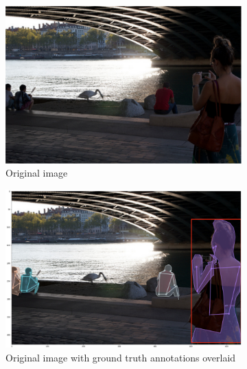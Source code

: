 \documentclass[11pt, letterpaper]{article}
\begin{document}
\begin{figure}[h]
    \centering
    \begin{subfigure}{0.4\linewidth}
        \includegraphics[width=\textwidth]{original_image.png}
        \caption{Original image}
    \end{subfigure}
    \begin{subfigure}{0.4\linewidth}
        \includegraphics[width=\textwidth]{original_w_gt.png}
        \caption{Original image with ground truth annotations overlaid}
    \end{subfigure}
    \begin{subfigure}{0.4\linewidth}

\end{subfigure}
\end{figure}
\end{document}
